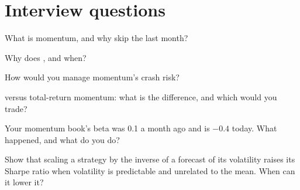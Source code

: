 \section{Interview questions}

\begin{interviewq}\label{iq:s1:momentum:1}
What is momentum, and why skip the last month?
\end{interviewq}

\begin{interviewq}\label{iq:s1:momentum:2}
Why does , and when?
\end{interviewq}

\begin{interviewq}\label{iq:s1:momentum:3}
How would you manage momentum's crash risk?
\end{interviewq}

\begin{interviewq}\label{iq:s1:momentum:4}
 versus total-return momentum: what is the difference, and which would you trade?
\end{interviewq}

\begin{interviewq}\label{iq:s1:momentum:5}
Your momentum book's beta was 0.1 a month ago and is $-0.4$ today. What happened, and what do you do?
\end{interviewq}

\begin{interviewq}\label{iq:s1:momentum:6}
Show that scaling a strategy by the inverse of a forecast of its volatility raises its Sharpe ratio when volatility is predictable and unrelated to the mean.
When can it lower it?
\end{interviewq}
